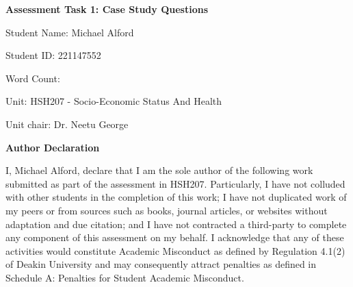 \begin{titlepage}
  \begin{center}
    \textbf{Assessment Task 1: Case Study Questions}
    
    \vspace{1.0cm}
    
    Student Name: Michael Alford
    
    \vspace{1.0cm}
    
    Student ID: 221147552
    
    \vspace{1.0cm}
    
    Word Count: 
    
    \vspace{1.0cm}
    
    Unit: HSH207 - Socio-Economic Status And Health
    
    \vspace{1.0cm}
    
    Unit chair: Dr. Neetu George

    \vfill

    \textbf{Author Declaration}

    I, Michael Alford, declare that I am the sole author of the following work submitted as part of the assessment  in  HSH207.  Particularly,  I  have  not  colluded  with  other  students  in  the  completion  of this work; I have not duplicated work     of my peers or from sources such as books, journal articles, or websites  without  adaptation  and  due  citation;  and  I  have  not  contracted  a  third-party  to  complete any  component  of  this  assessment  on  my  behalf.  I  acknowledge that any  of  these  activities  would constitute  Academic  Misconduct  as  defined  by  Regulation  4.1(2)  of  Deakin  University  and  may consequently attract penalties as defined in Schedule A: Penalties for Student Academic Misconduct.
    
  \end{center}
\end{titlepage}